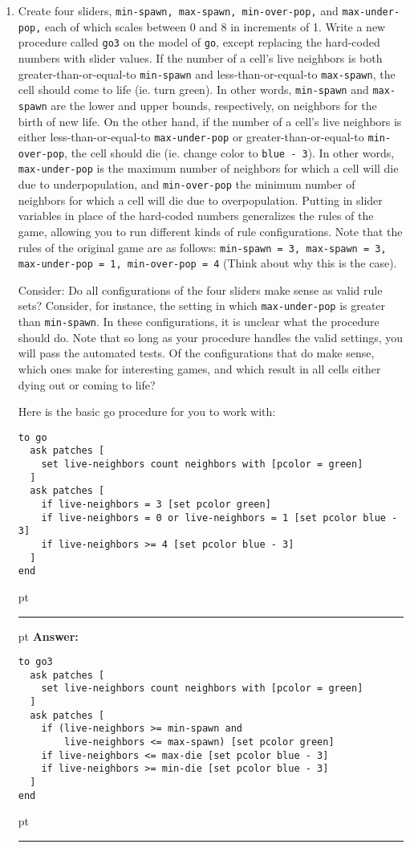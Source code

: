 \documentclass[11pt]{book}
\begin{document}
\begin{enumerate}
\item Create four sliders, \texttt{min-spawn, max-spawn, min-over-pop,} and \texttt{max-under-pop,} each of which scales between 0 and 8 in increments of 1. Write a new procedure called \texttt{go3} on the model of \texttt{go}, except replacing the hard-coded numbers with slider values. If the number of a cell's live neighbors is both greater-than-or-equal-to \texttt{min-spawn} and less-than-or-equal-to \texttt{max-spawn}, the cell should come to life (ie. turn green). In other words, \texttt{min-spawn} and \texttt{max-spawn} are the lower and upper bounds, respectively, on neighbors for the birth of new life. On the other hand, if the number of a cell's live neighbors is either less-than-or-equal-to \texttt{max-under-pop} or greater-than-or-equal-to \texttt{min-over-pop}, the cell should die (ie. change color to \texttt{blue - 3}). In other words, \texttt{max-under-pop} is the maximum number of neighbors for which a cell will die due to underpopulation, and \texttt{min-over-pop} the minimum number of neighbors for which a cell will die due to overpopulation. Putting in slider variables in place of the hard-coded numbers generalizes the rules of the game, allowing you to run different kinds of rule configurations. Note that the rules of the original game are as follows: \texttt{min-spawn = 3, max-spawn = 3, max-under-pop = 1, min-over-pop = 4} (Think about why this is the case).

Consider: Do all configurations of the four sliders make sense as valid rule sets? Consider, for instance, the setting in which \texttt{max-under-pop} is greater than \texttt{min-spawn}. In these configurations, it is unclear what the procedure should do. Note that so long as your procedure handles the valid settings, you will pass the automated tests. Of the configurations that do make sense, which ones make for interesting games, and which result in all cells either dying out or coming to life?

Here is the basic go procedure for you to work with:
\begin{verbatim}
to go
  ask patches [
    set live-neighbors count neighbors with [pcolor = green]
  ]
  ask patches [
    if live-neighbors = 3 [set pcolor green]
    if live-neighbors = 0 or live-neighbors = 1 [set pcolor blue - 3]
    if live-neighbors >= 4 [set pcolor blue - 3]
  ]
end
\end{verbatim}

\ifnum{}
 pt
\hrule
{} pt
{\bf Answer: }
\begin{verbatim}
to go3
  ask patches [
    set live-neighbors count neighbors with [pcolor = green]
  ]
  ask patches [
    if (live-neighbors >= min-spawn and 
        live-neighbors <= max-spawn) [set pcolor green]
    if live-neighbors <= max-die [set pcolor blue - 3]
    if live-neighbors >= min-die [set pcolor blue - 3]
  ]
end
\end{verbatim}
 pt
\hrule
\fi

\end{enumerate}

%


%
\end{document}
